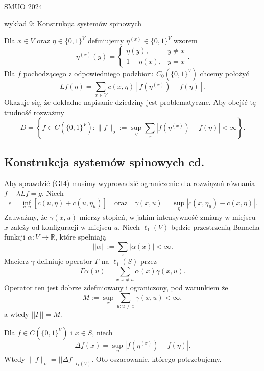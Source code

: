 \documentclass{article}
\begin{document}
SMUO 2024

wykład 9: Konstrukcja systemów spinowych

Dla $x \in V$ oraz $\eta \in \{0,1\}^V$ definiujemy $\eta^{(x)} \in \{0,1\}^V$
wzorem
\begin{equation*}
	\eta^{(x)}(y) = \left\{ 
	\begin{array}{cc} \eta(y), & y \neq x \\ 1-\eta(x), & y=x \end{array}\right..
\end{equation*}
Dla $f$ pochodzącego z odpowiedniego podzbioru  $C_0(\{0,1\}^V)$ chcemy
położyć
\begin{equation}\label{eq:4:defL}
	Lf(\eta) = \sum_{x\in V} c(x, \eta)\left[f\left(\eta^{(x)}\right) - f(\eta)\right].
\end{equation}
Okazuje się, że dokładne napisanie dziedziny jest problematyczne. Aby obejść tę trudność 
rozważmy
\begin{equation}\label{eq:4:defD}
	D = \left\{ f \in C(\{0,1\}^V) : \|f\|_o := \sup_{\eta} \sum_x \left|f\left(\eta^{(x)}\right) - f(\eta)\right| < \infty \right\}.
\end{equation}
\subsection*{Konstrukcja systemów spinowych cd.}

	Aby sprawdzić (GI4) musimy wyprowadzić ograniczenie 
	dla rozwiązań równania $f - \lambda Lf = g$. Niech
	\[
		\epsilon = \inf_{u, \eta} [c(u, \eta) + c(u, \eta_u)] \quad \text{oraz} 
		\quad \gamma(x, u) = \sup_\eta |c(x, \eta_u) - c(x, \eta)|.
	\]
	Zauważmy, że $\gamma(x,u)$ mierzy stopień, w jakim intensywność zmiany w miejscu $x$ 
	zależy od konfiguracji w miejscu $u$. 
	Niech $\ell_1(V)$ będzie przestrzenią Banacha 
	funkcji $\alpha : V \to \mathbb{R}$, które spełniają
	\[
		||\alpha|| := \sum_x |\alpha(x)| < \infty.
	\]
	Macierz $\gamma$ definiuje operator $\Gamma$ na $\ell_1(S)$ przez
	\[
		\Gamma \alpha(u) = \sum_{x: x \neq u} \alpha(x) \gamma(x, u).
	\]
	Operator ten jest dobrze zdefiniowany i ograniczony, pod warunkiem że
	\[
		M := \sup_x \sum_{u: u \neq x} \gamma(x, u) < \infty,
	\]
	a wtedy $||\Gamma|| = M$.


	Dla $f \in C(\{0,1\}^V)$ i $x \in S$, niech
	\[
		\Delta f(x) = \sup_{\eta} \left|f\left(\eta^{(x)}\right) - f(\eta)\right|.
	\]
	Wtedy $\|f\|_o = ||\Delta f||_{l_1(V)}$. Oto oszacowanie, którego potrzebujemy.
\end{document}
